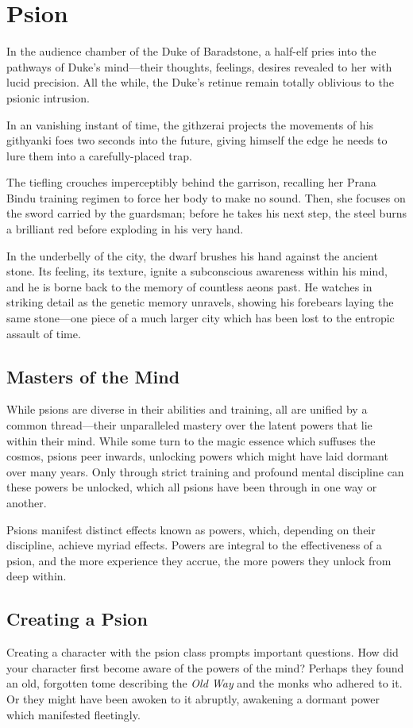 \section{Psion}
\label{sec:psion}
\DndSetThemeColor[DmgLavender]
In the audience chamber of the Duke of Baradstone,
a half-elf pries into the pathways of Duke's mind---their
thoughts, feelings, desires revealed to her
with lucid precision.
All the while, the Duke's retinue remain totally oblivious
to the psionic intrusion.

In an vanishing instant of time,
the githzerai projects the movements of his
githyanki foes two seconds into the future,
giving himself the edge he needs to lure them
into a carefully-placed trap.

The tiefling crouches imperceptibly behind the garrison,
recalling her Prana Bindu training regimen to force
her body to make no sound.
Then, she focuses on the sword carried by the guardsman;
before he takes his next step,
the steel burns a brilliant red before exploding in his
very hand.

In the underbelly of the city,
the dwarf brushes his hand against the ancient stone.
Its feeling, its texture, ignite a subconscious
awareness within his mind,
and he is borne back to the memory of countless aeons
past.
He watches in striking detail as the genetic memory unravels,
showing his forebears laying the same stone---one piece
of a much larger city which has been lost to the entropic
assault of time.

\subsection{Masters of the Mind}
While psions are diverse in their abilities and training,
all are unified by a common thread---their unparalleled
mastery over the latent powers that lie within their mind.
While some turn to the magic essence which suffuses the cosmos,
psions peer inwards,
unlocking powers which might have laid dormant over many years.
Only through strict training and profound mental discipline
can these powers be unlocked,
which all psions have been through in one way or another.

Psions manifest distinct effects known as powers, which,
depending on their discipline, achieve myriad effects.
Powers are integral to the effectiveness of a psion,
and the more experience they accrue,
the more powers they unlock from deep within.

\subsection{Creating a Psion}
Creating a character with the psion class prompts
important questions.
How did your character first become aware of the
powers of the mind?
Perhaps they found an old, forgotten tome
describing the \emph{Old Way} and the monks who adhered
to it.
Or they might have been awoken to it abruptly,
awakening a dormant power which manifested fleetingly.

